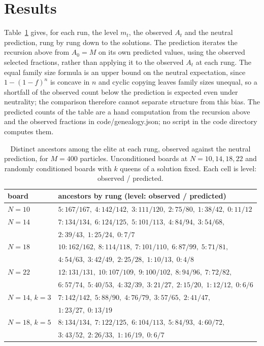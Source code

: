 \section{Results}

Table~\ref{tab:genealogy} gives, for each run, the level $m_t$, the observed $A_t$ and the neutral prediction, rung by rung down to the solutions. The prediction iterates the recursion above from $A_0 = M$ on its own predicted values, using the observed selected fractions, rather than applying it to the observed $A_t$ at each rung. The equal family size formula is an upper bound on the neutral expectation, since $1 - (1-f)^n$ is concave in $n$ and cyclic copying leaves family sizes unequal, so a shortfall of the observed count below the prediction is expected even under neutrality; the comparison therefore cannot separate structure from this bias. The predicted counts of the table are a hand computation from the recursion above and the observed fractions in code/genealogy.json; no script in the code directory computes them.

\begin{table}[t]
\centering
\footnotesize
\caption{\footnotesize Distinct ancestors among the elite at each rung, observed against the neutral prediction, for $M = 400$ particles. Unconditioned boards at $N = 10, 14, 18, 22$ and randomly conditioned boards with $k$ queens of a solution fixed. Each cell is level: observed / predicted.}
\label{tab:genealogy}
\begin{tabular}{lp{4.3in}}
\toprule
board & ancestors by rung (level: observed / predicted) \\
\midrule
$N = 10$ & $5{:}167/167, \; 4{:}142/142, \; 3{:}111/120, \; 2{:}75/80, \; 1{:}38/42, \; 0{:}11/12$ \\
$N = 14$ & $7{:}134/134, \; 6{:}124/125, \; 5{:}101/113, \; 4{:}84/94, \; 3{:}54/68,$ \\
 & $2{:}39/43, \; 1{:}25/24, \; 0{:}7/7$ \\
$N = 18$ & $10{:}162/162, \; 8{:}114/118, \; 7{:}101/110, \; 6{:}87/99, \; 5{:}71/81,$ \\
 & $4{:}54/63, \; 3{:}42/49, \; 2{:}25/28, \; 1{:}10/13, \; 0{:}4/8$ \\
$N = 22$ & $12{:}131/131, \; 10{:}107/109, \; 9{:}100/102, \; 8{:}94/96, \; 7{:}72/82,$ \\
 & $6{:}57/74, \; 5{:}40/53, \; 4{:}32/39, \; 3{:}21/27, \; 2{:}15/20, \; 1{:}12/12, \; 0{:}6/6$ \\
$N = 14$, $k = 3$ & $7{:}142/142, \; 5{:}88/90, \; 4{:}76/79, \; 3{:}57/65, \; 2{:}41/47,$ \\
 & $1{:}23/27, \; 0{:}13/19$ \\
$N = 18$, $k = 5$ & $8{:}134/134, \; 7{:}122/125, \; 6{:}104/113, \; 5{:}84/93, \; 4{:}60/72,$ \\
 & $3{:}43/52, \; 2{:}26/33, \; 1{:}16/19, \; 0{:}6/7$ \\
\bottomrule
\end{tabular}
\end{table}

